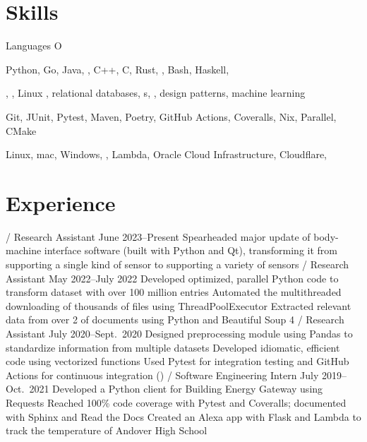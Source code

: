 \section{Skills}
\begin{labeling}{Languages O}
    \item [Languages] Python, Go, Java, , C++, C, Rust, , Bash, Haskell, \textsmaller{\LaTeX}
    \item [Concepts] , , Linux , relational databases, s, , design patterns, machine learning
    \item [Tools] Git, JUnit, Pytest, Maven, Poetry, GitHub Actions, Coveralls, Nix,  Parallel, CMake
    \item [Platforms] Linux, mac, Windows, ,  Lambda, Oracle Cloud Infrastructure, Cloudflare, 
\end{labeling}

\section{Experience}
\begin{outline}
     / Research Assistant
    \hfill June 2023--Present
        \1 Spearheaded major update of body-machine interface software (built with Python and Qt),
        transforming it from supporting a single kind of sensor to supporting a variety of sensors
     / Research Assistant
    \hfill May 2022--July 2022
        \1 Developed optimized, parallel Python code to transform dataset with over 100 million entries
        \1 Automated the multithreaded downloading of thousands of files using ThreadPoolExecutor
        \1 Extracted relevant data from over 2  of   documents using Python and Beautiful Soup 4
     / Research Assistant
    \hfill July 2020--Sept.\ 2020
        \1 Designed preprocessing module using Pandas to standardize information from multiple datasets
            \2 Developed idiomatic, efficient code using vectorized functions
            \2 Used Pytest for integration testing and GitHub Actions for continuous integration ()
     / Software Engineering Intern
    \hfill July 2019--Oct.\ 2021
        \1 Developed a Python client for Building Energy Gateway using Requests
            \2 Reached 100\% code coverage with Pytest and Coveralls; documented  with Sphinx and Read the Docs
        \1 Created an Alexa app with Flask and  Lambda to track the temperature of Andover High School
\end{outline}

